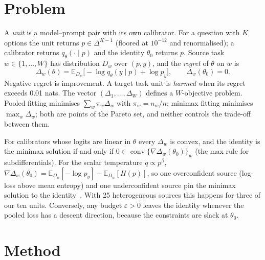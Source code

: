 \documentclass[runningheads]{llncs}
\newcommand{\E}{\mathbb{E}}
\newcommand{\conv}{\operatorname{conv}}
\begin{document}
\section{Problem}\label{sec:problem}
A \emph{unit} is a model--prompt pair with its own calibrator.
For a question with $K$ options the unit returns $p\in\Delta^{K-1}$ (floored at $10^{-12}$ and renormalised); a calibrator returns $q_\theta(\cdot\mid p)$ and the identity $\theta_0$ returns $p$.
Source task $w\in\{1,\dots,W\}$ has distribution $D_w$ over $(p,y)$, and the \emph{regret} of $\theta$ on $w$ is
\begin{equation}
\Delta_w(\theta)=\E_{D_w}\big[-\log q_\theta(y\mid p)+\log p_y\big],\qquad\Delta_w(\theta_0)=0.
\end{equation}
Negative regret is improvement.
A target task unit is \emph{harmed} when its regret exceeds 0.01 nats.
The vector $(\Delta_1,\dots,\Delta_W)$ defines a $W$-objective problem.
Pooled fitting minimises $\sum_w\pi_w\Delta_w$ with $\pi_w=n_w/n$; minimax fitting minimises $\max_w\Delta_w$; both are points of the Pareto set, and neither controls the trade-off between them.

For calibrators whose logits are linear in $\theta$ every $\Delta_w$ is convex, and the identity is the minimax solution if and only if $0\in\conv\{\nabla\Delta_w(\theta_0)\}_w$ (the max rule for subdifferentials).
For the scalar temperature $q\propto p^\beta$, $\nabla\Delta_w(\theta_0)=\E_{D_w}[-\log p_y]-\E_{D_w}[H(p)]$, so one overconfident source (log-loss above mean entropy) and one underconfident source pin the minimax solution to the identity~\cite{calport2026}.
With 25 heterogeneous sources this happens for three of our ten units.
Conversely, any budget $\varepsilon>0$ leaves the identity whenever the pooled loss has a descent direction, because the constraints are slack at $\theta_0$.

\section{Method}\label{sec:method}
\end{document}
